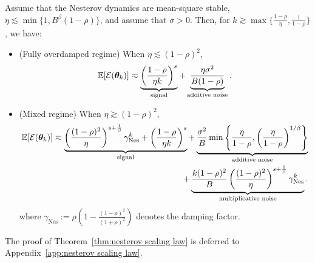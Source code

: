 \documentclass[11pt]{article}
\begin{document}
\begin{theorem}
\label{thm:nesterov scaling law}
Assume that the Nesterov dynamics are mean-square stable, $\eta\lesssim\min\{1,B^\beta(1-\rho)\}$, and assume that \(\sigma>0\). Then, for $k\gtrsim\max\{\frac{1-\rho}{\eta},\frac{1}{1-\rho}\}$, we have:
\begin{itemize}
\item (Fully overdamped regime) When \(\eta\lesssim(1-\rho)^2\),
\begin{equation}
\label{eq:nag-loss-overdamped}
\mathbb{E}[\mathcal{E}(\bm{\theta}_k)]
\eqsim
\underbrace{
\left(\frac{1-\rho}{\eta k}\right)^s
}_{\text{signal}}
+
\underbrace{
\frac{\eta\sigma^2}{B(1-\rho)}
}_{\text{additive noise}}.
\end{equation}
\vspace{-1em}
\item (Mixed regime) When \(\eta\gtrsim(1-\rho)^2\),
\begin{equation}
\label{eq:nag-loss-mixed}
\begin{aligned}
\EE[\cE(\btheta_k)]
\eqsim
\underbrace{\left(\frac{(1-\rho)^2}{\eta}\right)^{s+\frac{1}{\beta}}\gamma_{\mathrm{Nes}}^k+
\left(\frac{1-\rho}{\eta k}\right)^s
}_{\text{signal}}
+
\underbrace{
\frac{\sigma^2}{B}\min\left\{\frac{\eta}{1-\rho},\left(\frac{\eta}{1-\rho}\right)^{1/\beta}\right\}
}_{\text{additive noise}}\\
+
\underbrace{\frac{k(1-\rho)^2}{B} \left(\frac{(1-\rho)^2}{\eta}\right)^{s+\frac{1}{\beta}}\gamma_{\mathrm{Nes}}^k }_{\text{multiplicative noise}}
.
\vspace{-0.5em}
\end{aligned}
\end{equation}
where $\gamma_{\mathrm{Nes}}:=\rho\left(1-\frac{(1-\rho)^2}{(1+\rho)^2}\right)$ denotes the damping factor.
\end{itemize}
\end{theorem}
The proof of Theorem~\ref{thm:nesterov scaling law} is deferred to Appendix~\ref{app:nesterov scaling law}.
\end{document}
